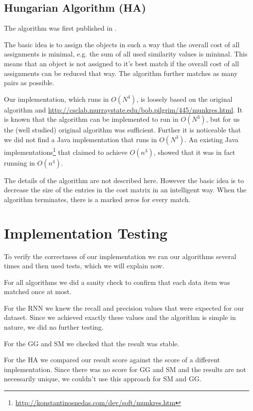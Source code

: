 \documentclass[a4paper,11pt]{article}
\begin{document}
\subsection{Hungarian Algorithm (HA)}

The algorithm was first published in \cite{ha_firstpub}.

The basic idea is to assign the objects in such a way that the overall cost of all assignments is minimal, e.g. the sum of all used similarity values is minimal. This means that an object is not assigned to it's best match if the overall cost of all assignments can be reduced that way. The algorithm further matches as many pairs as possible.

Our implementation, which runs in $O(N^4)$, is loosely based on the original algorithm and  \url{http://csclab.murraystate.edu/bob.pilgrim/445/munkres.html}. It is known that the algorithm can be implemented to run in $O(N^3)$, but for us the (well studied) original algorithm was sufficient. Further it is noticeable that we did not find a Java implementation that runs in $O(N^3)$. An existing Java implementations\footnote{\url{http://konstantinosnedas.com/dev/soft/munkres.htm}} that claimed to achieve $O(n^{3})$, showed that it was in fact running in $O(n^{4})$.

The details of the algorithm are not described here. However the basic idea is to decrease the size of the entries in the cost matrix in an intelligent way. When the algorithm terminates, there is a marked zeros for every match. 

\section{Implementation Testing}

To verify the correctness of our implementation we ran our algorithms several times and then used tests, which we will explain now.

For all algorithms we did a sanity check to confirm that each data item was matched once at most.

For the RNN we knew the recall and precision values that were expected for our dataset. Since we achieved exactly these values and the algorithm is simple in nature, we did no further testing.

For the GG and SM we checked that the result was stable.

For the HA we compared our result score against the score of a different implementation. Since there was no score for GG and SM and the results are not necessarily unique, we couldn't use this approach for SM and GG.
\end{document}
